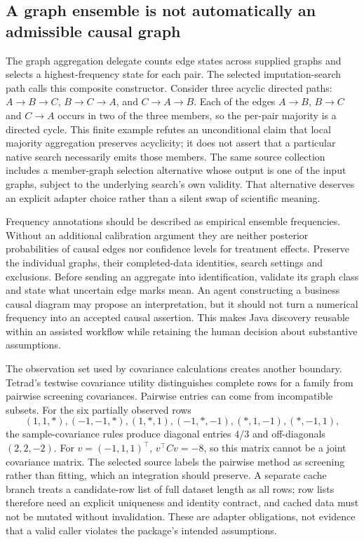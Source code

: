 \subsection*{A graph ensemble is not automatically an admissible causal graph}
The graph aggregation delegate counts edge states across supplied graphs and selects a highest-frequency state for each pair. The selected imputation-search path calls this composite constructor. Consider three acyclic directed paths: $A\to B\to C$, $B\to C\to A$, and $C\to A\to B$. Each of the edges $A\to B$, $B\to C$ and $C\to A$ occurs in two of the three members, so the per-pair majority is a directed cycle. This finite example refutes an unconditional claim that local majority aggregation preserves acyclicity; it does not assert that a particular native search necessarily emits those members. The same source collection includes a member-graph selection alternative whose output is one of the input graphs, subject to the underlying search's own validity. That alternative deserves an explicit adapter choice rather than a silent swap of scientific meaning.\citep{exec25_jtm_tetrad,exec25_jtm_choice}

Frequency annotations should be described as empirical ensemble frequencies. Without an additional calibration argument they are neither posterior probabilities of causal edges nor confidence levels for treatment effects. Preserve the individual graphs, their completed-data identities, search settings and exclusions. Before sending an aggregate into identification, validate its graph class and state what uncertain edge marks mean. An agent constructing a business causal diagram may propose an interpretation, but it should not turn a numerical frequency into an accepted causal assertion. This makes Java discovery reusable within an assisted workflow while retaining the human decision about substantive assumptions.\citep{exec25_jtm_tetrad,exec25_jtm_choice}

The observation set used by covariance calculations creates another boundary. Tetrad's testwise covariance utility distinguishes complete rows for a family from pairwise screening covariances. Pairwise entries can come from incompatible subsets. For the six partially observed rows
\[
 (1,1,*),(-1,-1,*),(1,*,1),(-1,*,-1),(*,1,-1),(*,-1,1),
\]
the sample-covariance rules produce diagonal entries $4/3$ and off-diagonals $(2,2,-2)$. For $v=(-1,1,1)^\top$, $v^\top C v=-8$, so this matrix cannot be a joint covariance matrix. The selected source labels the pairwise method as screening rather than fitting, which an integration should preserve. A separate cache branch treats a candidate-row list of full dataset length as all rows; row lists therefore need an explicit uniqueness and identity contract, and cached data must not be mutated without invalidation. These are adapter obligations, not evidence that a valid caller violates the package's intended assumptions.\citep{exec25_jtm_tetrad,exec25_jtm_choice}

